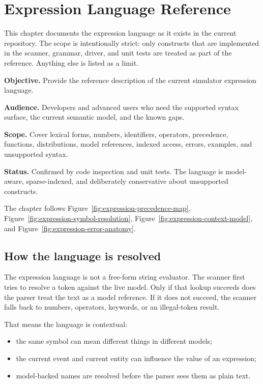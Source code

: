 \chapter{Expression Language Reference}
\label{chap:expression-language-reference}

This chapter documents the expression language as it exists in the current
repository. The scope is intentionally strict: only constructs that are
implemented in the scanner, grammar, driver, and unit tests are treated as
part of the reference. Anything else is listed as a limit.

\noindent\textbf{Objective.} Provide the reference description of the current
simulator expression language.

\noindent\textbf{Audience.} Developers and advanced users who need the
supported syntax surface, the current semantic model, and the known gaps.

\noindent\textbf{Scope.} Cover lexical forms, numbers, identifiers,
operators, precedence, functions, distributions, model references, indexed
access, errors, examples, and unsupported syntax.

\noindent\textbf{Status.} Confirmed by code inspection and unit tests. The
language is model-aware, sparse-indexed, and deliberately conservative about
unsupported constructs.

The chapter follows Figure~\ref{fig:expression-precedence-map},
Figure~\ref{fig:expression-symbol-resolution},
Figure~\ref{fig:expression-context-model}, and
Figure~\ref{fig:expression-error-anatomy}.

\section{How the language is resolved}
\label{sec:expression-reference-resolution}

The expression language is not a free-form string evaluator. The scanner first
tries to resolve a token against the live model. Only if that lookup succeeds
does the parser treat the text as a model reference. If it does not succeed,
the scanner falls back to numbers, operators, keywords, or an illegal-token
result.

That means the language is contextual:
\begin{itemize}
\item the same symbol can mean different things in different models;
\item the current event and current entity can influence the value of an
      expression;
\item model-backed names are resolved before the parser sees them as plain
      text.
\end{itemize}


